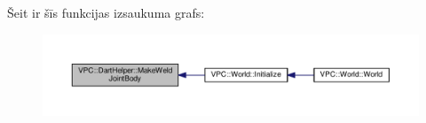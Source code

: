 Šeit ir šīs funkcijas izsaukuma grafs\+:
\nopagebreak
\begin{figure}[H]
\begin{center}
\leavevmode
\includegraphics[width=350pt]{namespace_v_p_c_1_1_dart_helper_a70dd049386ce8ba7d9fdb96407d8c3d3_icgraph}
\end{center}
\end{figure}


